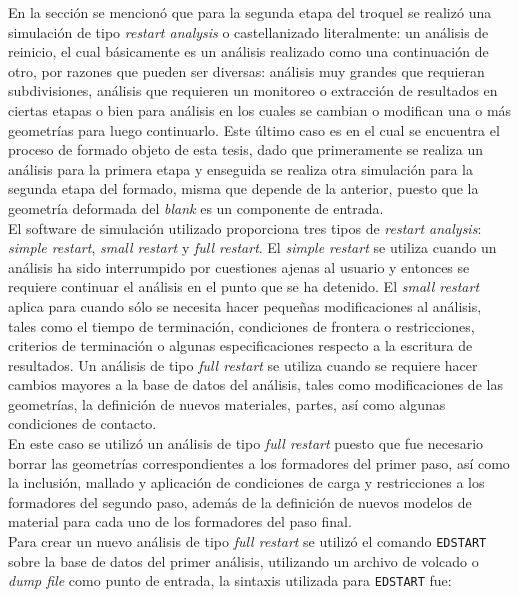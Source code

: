 En la sección \label{sec:consideraciones-generales} se mencionó que para la segunda etapa del troquel se realizó 
una simulación de tipo \textit{restart analysis} o castellanizado literalmente: un análisis de reinicio, el cual 
básicamente es un análisis realizado como una continuación de otro, por razones que pueden ser diversas: 
análisis muy grandes que requieran subdivisiones, análisis que requieren un monitoreo o extracción de resultados 
en ciertas etapas o bien para análisis en los cuales se cambian o modifican una o más geometrías para luego 
continuarlo. Este último caso es en el cual se encuentra el proceso de formado objeto de esta tesis, dado 
que primeramente se realiza un análisis para la primera etapa y enseguida se realiza otra simulación para 
la segunda etapa del formado, misma que depende de la anterior, puesto que la geometría deformada del \textit{blank} 
es un componente de entrada.\\

El software de simulación utilizado proporciona tres tipos de \textit{restart analysis}: \textit{simple restart}, 
\textit{small restart} y \textit{full restart}. El \textit{simple restart} se utiliza cuando un análisis ha sido 
interrumpido por cuestiones ajenas al usuario y entonces se requiere continuar el análisis en el punto que 
se ha detenido. El \textit{small restart} aplica para cuando sólo se necesita hacer pequeñas modificaciones al 
análisis, tales como el tiempo de terminación, condiciones de frontera o restricciones, criterios de terminación o algunas 
especificaciones respecto a la escritura de resultados. Un análisis de tipo \textit{full restart} se utiliza 
cuando se requiere hacer cambios mayores a la base de datos del análisis, tales como modificaciones de las geometrías, 
la definición de nuevos materiales, partes, así como algunas condiciones de contacto.\\

En este caso se utilizó un análisis de tipo \textit{full restart} puesto que fue necesario borrar las geometrías 
correspondientes a los formadores del primer paso, así como la inclusión, mallado y aplicación de condiciones 
de carga y restricciones a los formadores del segundo paso, además de la definición de nuevos modelos de material 
para cada uno de los formadores del paso final.\\

Para crear un nuevo análisis de tipo \textit{full restart} se utilizó el comando \texttt{EDSTART} sobre la 
base de datos del primer análisis, utilizando un archivo de volcado o \textit{dump file} como punto de entrada, 
la sintaxis utilizada para \texttt{EDSTART} fue:

